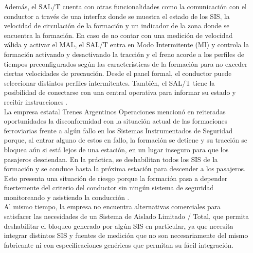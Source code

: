 Además, el SAL/T cuenta con otras funcionalidades como la comunicación con el conductor a través de una interfaz donde se muestra el estado de los SIS, la velocidad de circulación de la formación y un indicador de la zona donde se encuentra la formación. En caso de no contar con una medición de velocidad válida y activar el MAL, el SAL/T entra en Modo Intermitente (MI) y controla la formación activando y desactivando la tracción y el freno acorde a los perfiles de tiempos preconfigurados según las características de la formación para no exceder ciertas velocidades de precaución. Desde el panel formal, el conductor puede seleccionar distintos perfiles intermitentes.  También, el SAL/T tiene la posibilidad de conectarse con una central operativa para informar su estado y recibir instrucciones \cite{salt_paper}. \\


La empresa estatal Trenes Argentinos Operaciones \cite{trenes_arg} mencionó en reiteradas oportunidades la disconformidad con la situación actual de las formaciones ferroviarias frente a algún fallo en los Sistemas Instrumentados de Seguridad porque, al entrar alguno de estos en fallo,
la formación se detiene y su tracción se bloquea aún si está lejos de una estación, en un lugar inseguro para que los pasajeros desciendan. En la práctica, se deshabilitan todos los SIS de la formación y se conduce hasta la próxima estación para descender a los pasajeros. Esto presenta una situación de riesgo porque la formación pasa a depender fuertemente del criterio del conductor sin ningún sistema de seguridad monitoreando y asistiendo la conducción \cite{salt_paper}. \\

Al mismo tiempo, la empresa no encuentra alternativas comerciales para satisfacer las necesidades de un Sistema de Aislado Limitado / Total, que permita deshabilitar el bloqueo generado por algún SIS en particular, ya que necesita integrar distintos SIS y fuentes de medición que no son necesariamente del mismo fabricante ni con especificaciones genéricas que permitan su fácil integración.  \\

